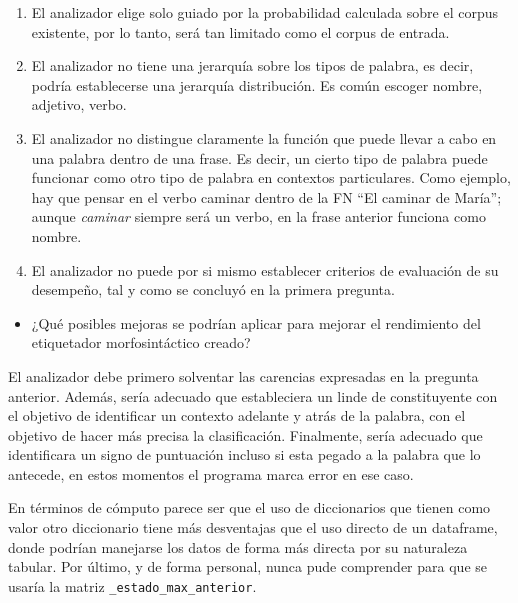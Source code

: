\documentclass[12pt,a4paper,table]{article}
\providecommand{\tightlist}{%
      \setlength{\itemsep}{0pt}\setlength{\parskip}{0pt}}
\begin{document}
\begin{enumerate}
\def\labelenumi{\arabic{enumi}.}
\tightlist
\item
  El analizador elige solo guiado por la probabilidad calculada sobre el
  corpus existente, por lo tanto, será tan limitado como el corpus de
  entrada.
\item
  El analizador no tiene una jerarquía sobre los tipos de palabra, es
  decir, podría establecerse una jerarquía distribución. Es común
  escoger nombre, adjetivo, verbo.
\item
  El analizador no distingue claramente la función que puede llevar a
  cabo en una palabra dentro de una frase. Es decir, un cierto tipo de
  palabra puede funcionar como otro tipo de palabra en contextos
  particulares. Como ejemplo, hay que pensar en el verbo caminar dentro
  de la FN ``El caminar de María''; aunque \emph{caminar} siempre será
  un verbo, en la frase anterior funciona como nombre.
\item
  El analizador no puede por si mismo establecer criterios de evaluación
  de su desempeño, tal y como se concluyó en la primera pregunta.
\end{enumerate}

    \begin{itemize}
\tightlist
\item
  ¿Qué posibles mejoras se podrían aplicar para mejorar el rendimiento
  del etiquetador morfosintáctico creado?
\end{itemize}

    El analizador debe primero solventar las carencias expresadas en la
pregunta anterior. Además, sería adecuado que estableciera un linde de
constituyente con el objetivo de identificar un contexto adelante y
atrás de la palabra, con el objetivo de hacer más precisa la
clasificación. Finalmente, sería adecuado que identificara un signo de
puntuación incluso si esta pegado a la palabra que lo antecede, en estos
momentos el programa marca error en ese caso.

En términos de cómputo parece ser que el uso de diccionarios que tienen
como valor otro diccionario tiene más desventajas que el uso directo de
un dataframe, donde podrían manejarse los datos de forma más directa por
su naturaleza tabular. Por último, y de forma personal, nunca pude
comprender para que se usaría la matriz
\texttt{\_estado\_max\_anterior}.


    
    
    
\end{document}
